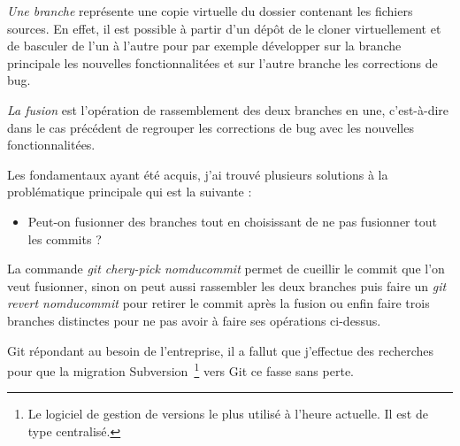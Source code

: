 \emph{Une branche} représente une \og copie virtuelle \fg{} du dossier contenant
les fichiers sources. En effet, il est possible à partir d'un dépôt de le
cloner virtuellement et de basculer de l'un à l'autre pour par exemple
développer sur la branche principale les nouvelles fonctionnalitées et sur
l'autre branche les corrections de bug.

\emph{La fusion} est l'opération de rassemblement des deux branches en une,
c'est-à-dire dans le cas précédent de regrouper les corrections de bug avec les
nouvelles fonctionnalitées.

Les fondamentaux ayant été acquis, j'ai trouvé plusieurs solutions à la
problématique principale qui est la suivante :
\begin{itemize}
    \item Peut-on fusionner des branches tout en choisissant de ne pas
fusionner tout les commits ?
\end{itemize}

La commande \emph{git chery-pick \og nomducommit \fg{}} permet de \og cueillir
\fg{} le commit que l'on veut fusionner, sinon on peut aussi rassembler les deux
branches puis faire un \emph{git revert \og nomducommit \fg{}} pour retirer le
commit après la fusion ou enfin faire trois branches distinctes pour ne pas
avoir à faire ses opérations ci-dessus.

Git répondant au besoin de l'entreprise, il a fallut que j'effectue des
recherches pour que la migration Subversion\, \footnote{Le logiciel de gestion
de versions le plus utilisé à l’heure actuelle. Il est de type centralisé.}
vers Git ce fasse sans perte.

\clearpage
